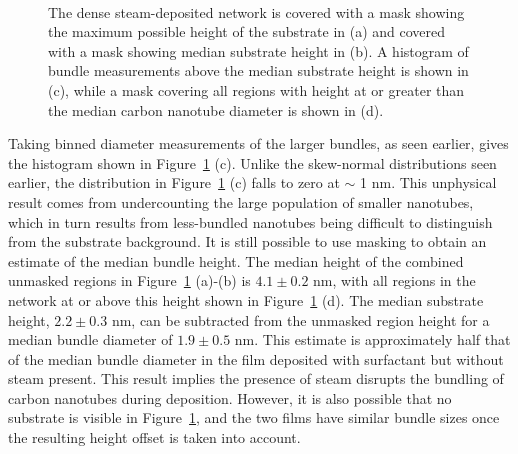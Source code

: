 \documentclass[
  a4paper,
]{scrbook}
\begin{document}
\begin{figure}
\begin{minipage}[t]{0.01\linewidth}
{\centering 

~

}

\end{minipage}%

\caption[An atomic force microscope image of a dense carbon nanotube
network which has been masked below various threshold heights, along
with corresponding histogram height distribution and kernel density
estimate plots.]{\label{fig-dense-network}The dense steam-deposited
network is covered with a mask showing the maximum possible height of
the substrate in (a) and covered with a mask showing median substrate
height in (b). A histogram of bundle measurements above the median
substrate height is shown in (c), while a mask covering all regions with
height at or greater than the median carbon nanotube diameter is shown
in (d).}

\end{figure}

Taking binned diameter measurements of the larger bundles, as seen
earlier, gives the histogram shown in Figure~\ref{fig-dense-network}
(c). Unlike the skew-normal distributions seen earlier, the distribution
in Figure~\ref{fig-dense-network} (c) falls to zero at \(\sim\) 1 nm.
This unphysical result comes from undercounting the large population of
smaller nanotubes, which in turn results from less-bundled nanotubes
being difficult to distinguish from the substrate background. It is
still possible to use masking to obtain an estimate of the median bundle
height. The median height of the combined unmasked regions in
Figure~\ref{fig-dense-network} (a)-(b) is \(4.1 \pm 0.2\) nm, with all
regions in the network at or above this height shown in
Figure~\ref{fig-dense-network} (d). The median substrate height,
\(2.2 \pm 0.3\) nm, can be subtracted from the unmasked region height
for a median bundle diameter of \(1.9 \pm 0.5\) nm. This estimate is
approximately half that of the median bundle diameter in the film
deposited with surfactant but without steam present. This result implies
the presence of steam disrupts the bundling of carbon nanotubes during
deposition. However, it is also possible that no substrate is visible in
Figure~\ref{fig-dense-network}, and the two films have similar bundle
sizes once the resulting height offset is taken into account.
\end{document}
